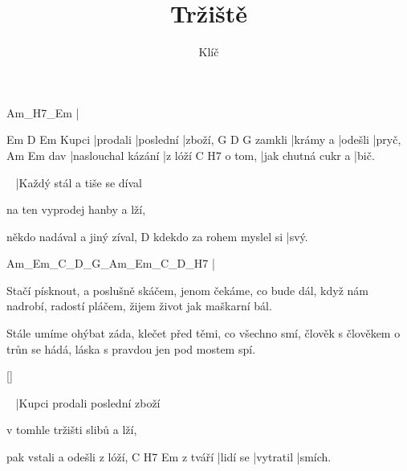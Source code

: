 \documentclass{song}
\title{Tržiště}
\author{Klíč}
\begin{document}
\strophe
Am_H7_Em
|
\endstrophe

\strophe
      Em       D         Em
Kupci |prodali |poslední |zboží,
       G        D       G
zamkli |krámy a |odešli |pryč,
    Am                 Em
dav |naslouchal kázání |z lóží
       C                  H7
o tom, |jak chutná cukr a |bič.
\endstrophe

\strophe
~
|Každý stál a tiše se díval

na ten vyprodej hanby a lží,

někdo nadával a jiný zíval,
                          D
kdekdo za rohem myslel si |svý.
\endstrophe

Am_Em_C_D_G_Am_Em_C_D_H7
|
\endstrophe

\strophe*
Stačí písknout, a poslušně skáčem,
jenom čekáme, co bude dál,
když nám nadrobí, radostí pláčem,
žijem život jak maškarní bál.
\endstrophe

\strophe*
Stále umíme ohýbat záda,
klečet před těmi, co všechno smí,
člověk s člověkem o trůn se hádá,
láska s pravdou jen pod mostem spí.
\endstrophe


\ref{}

\strophe
~
|Kupci prodali poslední zboží

v tomhle tržišti slibů a lží,

pak vstali a odešli z lóží,
        C        H7        Em
z tváří |lidí se |vytratil |smích.
\endstrophe
\end{document}
